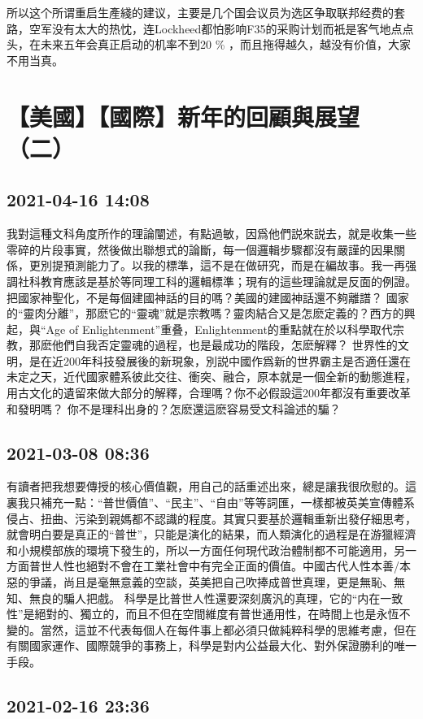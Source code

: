 \documentclass[twocolumn]{ctexart}
\begin{document}
所以这个所谓重启生產綫的建议，主要是几个国会议员为选区争取联邦经费的套路，空军没有太大的热忱，连Lockheed都怕影响F35的采购计划而衹是客气地点点头，在未来五年会真正启动的机率不到20 \% ，而且拖得越久，越没有价值，大家不用当真。\section*{【美國】【國際】新年的回顧與展望（二）}
\subsection*{2021-04-16 14:08}

我對這種文科角度所作的理論闡述，有點過敏，因爲他們説來説去，就是收集一些零碎的片段事實，然後做出聯想式的論斷，每一個邏輯步驟都沒有嚴謹的因果關係，更別提預測能力了。以我的標準，這不是在做研究，而是在編故事。我一再强調社科教育應該是基於等同理工科的邏輯標準；現有的這些理論就是反面的例證。
把國家神聖化，不是每個建國神話的目的嗎？美國的建國神話還不夠離譜？
國家的“靈肉分離”，那麽它的“靈魂”就是宗教嗎？靈肉結合又是怎麽定義的？西方的興起，與“Age of Enlightenment”重叠，Enlightenment的重點就在於以科學取代宗教，那麽他們自我否定靈魂的過程，也是最成功的階段，怎麽解釋？
世界性的文明，是在近200年科技發展後的新現象，別説中國作爲新的世界霸主是否適任還在未定之天，近代國家體系彼此交往、衝突、融合，原本就是一個全新的動態進程，用古文化的遺留來做大部分的解釋，合理嗎？你不必假設這200年都沒有重要改革和發明嗎？
你不是理科出身的？怎麽還這麽容易受文科論述的騙？
\subsection*{2021-03-08 08:36}

有讀者把我想要傳授的核心價值觀，用自己的話重述出來，總是讓我很欣慰的。這裏我只補充一點：“普世價值”、“民主”、“自由”等等詞匯，一樣都被英美宣傳體系侵占、扭曲、污染到親媽都不認識的程度。其實只要基於邏輯重新出發仔細思考，就會明白要是真正的“普世”，只能是演化的結果，而人類演化的過程是在游獵經濟和小規模部族的環境下發生的，所以一方面任何現代政治體制都不可能適用，另一方面普世人性也絕對不會在工業社會中有完全正面的價值。中國古代人性本善/本惡的爭議，尚且是毫無意義的空談，英美把自己吹捧成普世真理，更是無恥、無知、無良的騙人把戲。
科學是比普世人性還要深刻廣汎的真理，它的“内在一致性”是絕對的、獨立的，而且不但在空間維度有普世通用性，在時間上也是永恆不變的。當然，這並不代表每個人在每件事上都必須只做純粹科學的思維考慮，但在有關國家運作、國際競爭的事務上，科學是對内公益最大化、對外保證勝利的唯一手段。
\subsection*{2021-02-16 23:36}
\end{document}
